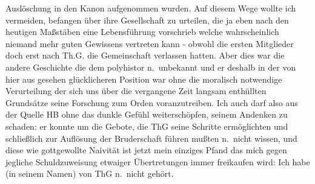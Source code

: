 \documentclass[
]{article}
\begin{document}
Auslöschung in den Kanon aufgenommen wurden. Auf diesem Wege wollte ich
vermeiden, befangen über ihre Gesellschaft zu urteilen, die ja eben nach
den heutigen Maßstäben eine Lebensführung vorschrieb welche
wahrscheinlich niemand mehr guten Gewissens vertreten kann - obwohl die
ersten Mitglieder doch erst nach Th.G. die Gemeinschaft verlassen
hatten. Aber dies war die andere Geschichte die dem polyhistor
n.~unbekannt und er deshalb in der von hier aus gesehen glücklicheren
Position war ohne die moralisch notwendige Verurteilung der sich uns
über die vergangene Zeit langsam enthüllten Grundsätze seine Forschung
zum Orden voranzutreiben. Ich auch darf also aus der Quelle HB ohne das
dunkle Gefühl weiterschöpfen, seinem Andenken zu schaden: er konnte um
die Gebote, die ThG seine Schritte ermöglichten und schließlich zur
Auflösung der Bruderschaft führen mußten n.~nicht wissen, und diese wie
gottgewollte Naivität ist jetzt mein einziges Pfand das mich gegen
jegliche Schuldzuweisung etwaiger Übertretungen immer freikaufen wird:
Ich habe (in seinem Namen) von ThG n.~nicht gehört.
\end{document}
